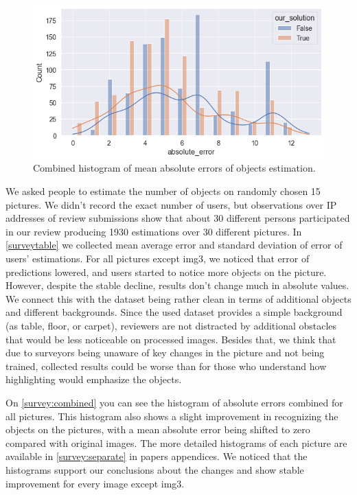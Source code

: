 \begin{figure}
    \centering
    \includegraphics[width=\linewidth]{figures/survey_combined.png}
    \caption{Combined histogram of mean absolute errors of objects estimation.}
    \label{survey:combined}
\end{figure}


We asked people to estimate the number of objects on randomly chosen 15 pictures. We didn't record the exact number of users, but observations over IP addresses of review submissions show that about 30 different persons participated in our review producing 1930 estimations over 30 different pictures. In \autoref{surveytable} we collected mean average error and standard deviation of error of users' estimations. For all pictures except img3, we noticed that error of predictions lowered, and users started to notice more objects on the picture. However, despite the stable decline, results don't change much in absolute values. We connect this with the dataset being rather clean in terms of additional objects and different backgrounds. Since the used dataset provides a simple background (as table, floor, or carpet), reviewers are not distracted by additional obstacles that would be less noticeable on processed images. Besides that, we think that due to surveyors being unaware of key changes in the picture and not being trained, collected results could be worse than for those who understand how highlighting would emphasize the objects.

On \autoref{survey:combined} you can see the histogram of absolute errors combined for all pictures. This histogram also shows a slight improvement in recognizing the objects on the pictures, with a mean absolute error being shifted to zero compared with original images. The more detailed histograms of each picture are available in \autoref{survey:separate} in papers appendices. We noticed that the histograms support our conclusions about the changes and show stable improvement for every image except img3. 

